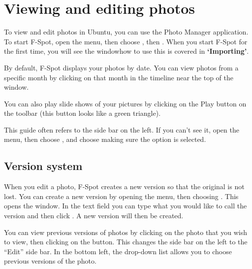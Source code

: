 

\section{Viewing and editing photos}

To view and edit photos in Ubuntu, you can use the  Photo
Manager application. To start F-Spot, open the  menu, then
choose , then .  When you start F-Spot
for the first time, you will see the  window\dash how to use
this is covered in \textbf{`Importing'}.

By default, F-Spot displays your photos by date. You can view photos from a 
specific month by clicking on that month in the timeline near the top of the 
window.

You can also play slide shows of your pictures by clicking on the Play button
on the toolbar (this button looks like a green triangle).


This guide often refers to the side bar on the left. If you can't see it,  
open the  menu, then choose , and choose 
\dash making sure the option is selected. 

\subsection{Version system}

When you edit a photo, F-Spot creates a new version so that the original is 
not lost. You can create a new version by opening the  menu, then 
choosing . This opens the  
window. In the  text field you can type what you would like to 
call the version and then click . A new version will then be created.

You can view previous versions of photos by clicking on the photo that you wish 
to view, then clicking on the  button. This changes the side 
bar on the left to the ``Edit'' side bar. In the bottom left, the 
 drop-down list allows you to choose previous versions of the 
photo. 

